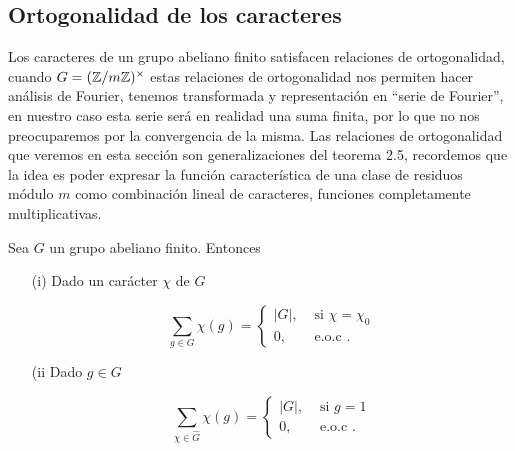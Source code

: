 \subsection{Ortogonalidad de los caracteres}

Los caracteres de un grupo abeliano finito satisfacen relaciones de ortogonalidad, cuando $G=(\mathbb{Z}/m\mathbb{Z})^{\times}$ estas relaciones de ortogonalidad nos permiten hacer análisis de Fourier, tenemos transformada y representación en ``serie de Fourier'', en nuestro caso esta serie será en realidad una suma finita, por lo que no nos preocuparemos por  la convergencia de la misma. Las relaciones de ortogonalidad que veremos en esta sección son generalizaciones del teorema 2.5, recordemos que la idea es poder expresar la función característica de una clase de residuos módulo $m$ como combinación lineal de caracteres, funciones completamente multiplicativas.

\begin{theorem}
Sea $G$ un grupo abeliano finito. Entonces

\begin{itemize}
    \item [(i)] Dado un carácter $\chi$ de $G$

$$
\sum_{g \in G} \chi(g)= \begin{cases}|G|, & \text { si } \chi=\chi_0 \\ 0, & \text { e.o.c }.\end{cases}
$$

\item[(ii] Dado $g \in G$

$$
\sum_{\chi \in \widehat{G}} \chi(g)= \begin{cases}|G|, & \text { si } g=1 \\ 0, & \text { e.o.c }.\end{cases}
$$
\end{itemize}

\end{theorem}

